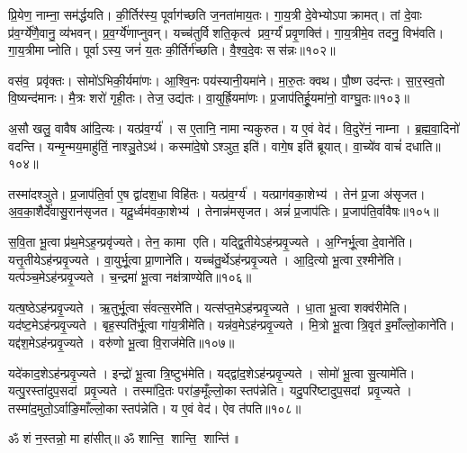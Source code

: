 प्रि॒येण॒ नाम्ना॒ सम॑र्द्धयति। की॒र्तिर॑स्य॒ पूर्वाग॑च्छति ज॒नता॑माय॒तः। गा॒य॒त्री दे॒वेभ्योऽपाक्रामत्। तां दे॒वाः प्र॑व॒र्ग्ये॑णै॒वानु॒ व्य॑भवन्। प्र॒व॒र्ग्ये॑णाप्नुवन्। यच्च॑तुर्विशति॒कृत्व॑ प्रव॒र्ग्यं॑ प्रवृ॒णक्ति॑। गा॒य॒त्रीमे॒व तदनु॒ विभ॑वति। गा॒य॒त्रीमाप्नोति। पूर्वाऽस्य॒ जनं॑ य॒तः की॒र्तिर्ग॑च्छति। वै॒श्व॒दे॒वः सस॑न्नः॥१०२॥

वस॑व॒ प्रवृ॑क्तः। सोमो॑ऽभिकी॒र्यमा॑णः। आ॒श्वि॒नः पय॑स्यानी॒यमा॑ने। मा॒रु॒तः क्वथ\sn{}। पौ॒ष्ण उद॑न्तः। सा॒र॒स्व॒तो वि॒ष्यन्द॑मानः। मै॒त्रः  शरो॑ गृही॒तः। तेज॒ उद्य॑तः। वा॒युर्ह्रि॒यमा॑णः। प्र॒जाप॑तिर्\mbox{}हू॒यमा॑नो॒ वाग्घु॒तः॥१०३॥

अ॒सौ खलु॒ वावैष आ॑दि॒त्यः। यत्प्र॑व॒र्ग्य॑। स ए॒तानि॒ नामान्यकुरुत। य ए॒वं वेद॑। वि॒दुरे॑नं॒ नाम्ना। ब्र॒ह्म॒वा॒दिनो॑ वदन्ति। यन्मृ॒न्मय॒माहु॑तिं॒ नाश्ञु॒तेऽथ॑। कस्मा॑दे॒षोऽश्ञुत॒ इति॑। वागे॒ष इति॑ ब्रूयात्। वा॒च्ये॑व वाचं॑ दधाति॥१०४॥

तस्मा॑दश्ञुते। प्र॒जाप॑ति॒र्वा ए॒ष द्वा॑दश॒धा विहि॑तः। यत्प्र॑व॒र्ग्य॑। यत्प्राग॑वका॒शेभ्य॑। तेन॑ प्र॒जा अ॑सृजत। अ॒व॒का॒शैर्दे॑वासु॒रान॑सृजत। यदू॒र्ध्वम॑वका॒शेभ्य॑। तेनान्न॑म\-सृजत। अन्नं॑ प्र॒जाप॑तिः। प्र॒जाप॑ति॒र्वावैषः॥१०५॥
\anuvakamend[व॒द॒न्ति॒ त॒नुवा॒ सस॑न्नो हू॒यमा॑नो॒ वाग्घु॒तो द॑धात्ये॒षः]

स॒वि॒ता भू॒त्वा प्र॑थ॒मेऽह॒न्प्रवृ॑ज्यते। तेन॒ कामा एति। यद्द्वि॒तीयेऽह॑न्प्रवृ॒ज्यते। अ॒ग्निर्भू॒त्वा दे॒वाने॑ति। यत्तृ॒तीयेऽह॑न्प्र\-वृ॒ज्यते। वा॒युर्भू॒त्वा प्रा॒णाने॑ति। यच्च॑तु॒र्थेऽह॑न्प्रवृ॒ज्यते। आ॒दि॒त्यो भू॒त्वा र॒श्मीने॑ति। यत्प॑ञ्च॒मेऽह॑न्प्रवृ॒ज्यते। च॒न्द्रमा॑ भू॒त्वा नक्ष॑त्राण्येति॥१०६॥

यत्ष॒ष्ठेऽह॑न्प्रवृ॒ज्यते। ऋ॒तुर्भू॒त्वा सं॑वत्स॒रमे॑ति। यत्स॑प्त॒मेऽह॑न्प्र\-वृ॒ज्यते। धा॒ता भू॒त्वा शक्व॑रीमेति। यद॑ष्ट॒मेऽह॑न्प्रवृ॒ज्यते। बृह॒स्पति॑र्भू॒त्वा गा॑य॒त्रीमे॑ति। यन्न॑व॒मेऽह॑न्प्रवृ॒ज्यते। मि॒त्रो भू॒त्वा त्रि॒वृत॑ इ॒माँल्लो॒काने॑ति। यद्द॑श॒मेऽह॑न्प्रवृ॒ज्यते। वरु॑णो भू॒त्वा वि॒राज॑मेति॥१०७॥

यदे॑काद॒शेऽह॑न्प्रवृ॒ज्यते। इन्द्रो॑ भू॒त्वा त्रि॒ष्टुभ॑मेति। यद्द्वा॑द॒शेऽह॑न्प्र\-वृ॒ज्यते। सोमो॑ भू॒त्वा सु॒त्यामे॑ति। यत्पु॒रस्ता॑दुप॒सदां प्रवृ॒ज्यते। तस्मा॑दि॒तः परा॑ङ॒मूँल्लो॒का\-स्तप॑न्नेति। यदु॒परि॑ष्टादुप॒सदां प्रवृ॒ज्यते। तस्मा॑द॒मुतो॒ऽर्वा\-ङि॒माँल्लो॒का\-स्तप॑न्नेति। य ए॒वं वेद॑। ऐव त॑पति॥१०८॥
\anuvakamend[नक्ष॑त्राण्येति वि॒राज॑मेति तपति]

ॐ शं न॒स्तन्नो॒ मा हा॑सीत्॥ ॐ शान्ति॒ शान्ति॒ शान्ति॑॥

\closesection